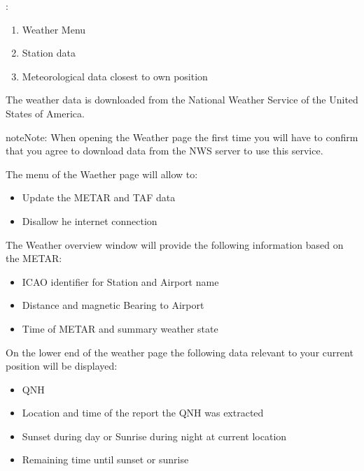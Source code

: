 \documentclass[letterpaper,10pt,english]{sphinxmanual}
\begin{document}
\begin{figure}[htbp]
\centering

\noindent{}
\end{figure}

:
\begin{enumerate}
%
\item {} 
Weather Menu

\item {} 
Station data

\item {} 
Meteorological data closest to own position

\end{enumerate}

The weather data is downloaded from the National Weather Service of the United States of America.

\begin{sphinxadmonition}{note}{Note:}
When opening the Weather page the first time you will have to confirm that you agree to download data from the NWS server to use this service.
\end{sphinxadmonition}

The menu of the Waether page will allow to:
\begin{itemize}
\item {} 
Update the METAR and TAF data

\item {} 
Disallow he internet connection

\end{itemize}

The Weather overview window will provide the following information based on the METAR:
\begin{itemize}
\item {} 
ICAO identifier for Station and Airport name

\item {} 
Distance and magnetic Bearing to Airport

\item {} 
Time of METAR and summary weather state

\end{itemize}

On the lower end of the weather page the following data relevant to your current position will be displayed:
\begin{itemize}
\item {} 
QNH

\item {} 
Location and time of the report the QNH was extracted

\item {} 
Sunset during day or Sunrise during night at current location

\item {} 
Remaining time until sunset or sunrise

\end{itemize}
\end{document}
